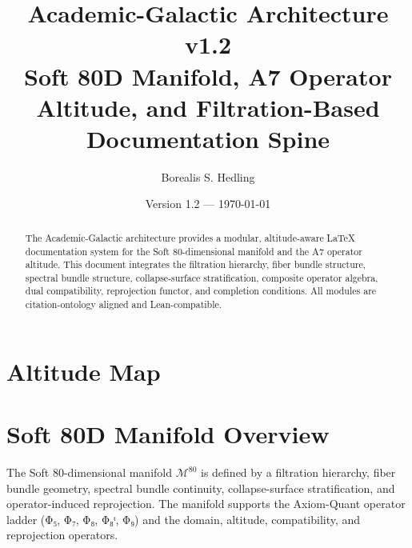 \documentclass[11pt]{article}
\title{\textbf{Academic-Galactic Architecture v1.2}\\
\large Soft 80D Manifold, A7 Operator Altitude, and Filtration-Based Documentation Spine}
\author{Borealis S. Hedling}
\date{Version 1.2 — \today}
\begin{document}
\maketitle

\begin{abstract}
The Academic-Galactic architecture provides a modular, altitude-aware LaTeX
documentation system for the Soft 80-dimensional manifold and the A7 operator
altitude. This document integrates the filtration hierarchy, fiber bundle
structure, spectral bundle structure, collapse-surface stratification,
composite operator algebra, dual compatibility, reprojection functor, and
completion conditions. All modules are citation-ontology aligned and
Lean-compatible.
\end{abstract}

\section*{Altitude Map}
\begin{center}
\end{center}

\section*{Soft 80D Manifold Overview}
The Soft 80-dimensional manifold $\mathcal{M}^{80}$ is defined by a filtration
hierarchy, fiber bundle geometry, spectral bundle continuity, collapse-surface
stratification, and operator-induced reprojection. The manifold supports the
Axiom-Quant operator ladder (Φ₅, Φ₇, Φ₈, Φ₈ᵗ, Φ₉) and the domain, altitude,
compatibility, and reprojection operators.
\end{document}
